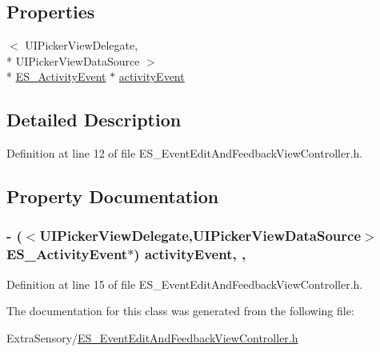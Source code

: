 \subsection*{Properties}
\begin{DoxyCompactItemize}
\item 
$<$ U\+I\+Picker\+View\+Delegate, \\*
U\+I\+Picker\+View\+Data\+Source $>$\\*
 \hyperlink{interface_e_s___activity_event}{E\+S\+\_\+\+Activity\+Event} $\ast$ \hyperlink{interface_e_s___event_edit_and_feedback_view_controller_ab9719b64f940b8f1e82979400b34406e}{activity\+Event}
\end{DoxyCompactItemize}


\subsection{Detailed Description}


Definition at line 12 of file E\+S\+\_\+\+Event\+Edit\+And\+Feedback\+View\+Controller.\+h.



\subsection{Property Documentation}
\hypertarget{interface_e_s___event_edit_and_feedback_view_controller_ab9719b64f940b8f1e82979400b34406e}{
\subsubsection[{activity\+Event}]{\setlength{\rightskip}{0pt plus 5cm}-\/ ($<$U\+I\+Picker\+View\+Delegate,U\+I\+Picker\+View\+Data\+Source$>$ {\bf E\+S\+\_\+\+Activity\+Event}$\ast$) activity\+Event\hspace{0.3cm}{\ttfamily [read]}, {\ttfamily [write]}, {\ttfamily [atomic]}}}\label{interface_e_s___event_edit_and_feedback_view_controller_ab9719b64f940b8f1e82979400b34406e}


Definition at line 15 of file E\+S\+\_\+\+Event\+Edit\+And\+Feedback\+View\+Controller.\+h.



The documentation for this class was generated from the following file\+:\begin{DoxyCompactItemize}
\item 
Extra\+Sensory/\hyperlink{_e_s___event_edit_and_feedback_view_controller_8h}{E\+S\+\_\+\+Event\+Edit\+And\+Feedback\+View\+Controller.\+h}\end{DoxyCompactItemize}
